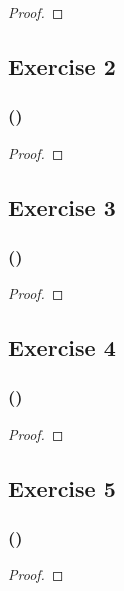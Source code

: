 \documentclass[14pt]{extarticle}
\begin{document}
\begin{proof}

\end{proof}

\subsection{Exercise 2}

\subsubsection{()}

\begin{proof}

\end{proof}

\subsection{Exercise 3}

\subsubsection{()}

\begin{proof}

\end{proof}

\subsection{Exercise 4}

\subsubsection{()}

\begin{proof}

\end{proof}

\subsection{Exercise 5}

\subsubsection{()}

\begin{proof}

\end{proof}
\end{document}
